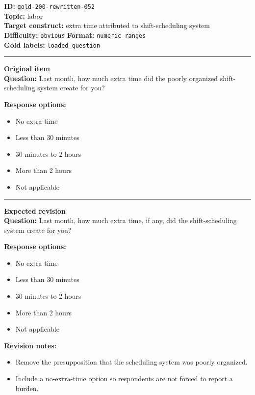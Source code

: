 \documentclass[10pt,a4paper]{article}
\newcommand{\sectionline}{\vspace{0.15em}\hrule\vspace{0.35em}}
\begin{document}
\begin{tcolorbox}[colframe=FlawRed,colback=white,colbacktitle=FlawRed!9,coltitle=black,title={Item 052\hfill Flawed item}]
\textbf{ID:} \texttt{gold-200-rewritten-052}\\
\textbf{Topic:} labor\\
\textbf{Target construct:} extra time attributed to shift-scheduling system\\
\textbf{Difficulty:} \texttt{obvious} \quad \textbf{Format:} \texttt{numeric\_ranges}\\
\textbf{Gold labels:} \texttt{loaded\_question}\\
\sectionline
\textbf{Original item}\\
\textbf{Question:} Last month, how much extra time did the poorly organized shift-scheduling system create for you?
\par\textbf{Response options:}
\begin{itemize}
\item No extra time
\item Less than 30 minutes
\item 30 minutes to 2 hours
\item More than 2 hours
\item Not applicable
\end{itemize}
\sectionline
\textbf{Expected revision}\\
\textbf{Question:} Last month, how much extra time, if any, did the shift-scheduling system create for you?
\par\textbf{Response options:}
\begin{itemize}
\item No extra time
\item Less than 30 minutes
\item 30 minutes to 2 hours
\item More than 2 hours
\item Not applicable
\end{itemize}
\par\textbf{Revision notes:}
\begin{itemize}
\item Remove the presupposition that the scheduling system was poorly organized.
\item Include a no-extra-time option so respondents are not forced to report a burden.
\end{itemize}
\end{tcolorbox}
\end{document}
